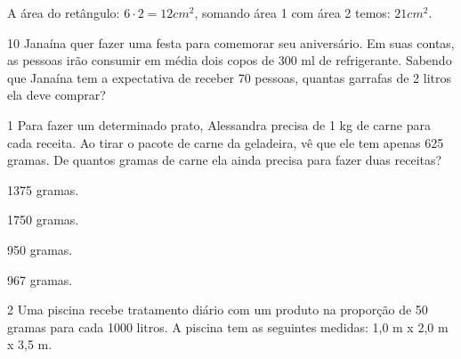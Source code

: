 {{{\begin{escolha}
{{{{\begin{escolha}
\begin{escolha}
{{\begin{enumerate}
{{{A área do retângulo: $6 \cdot 2 = 12 cm^2$, somando área 1 com área 2 temos: $21
cm^2$.}

\num{10} Janaína quer fazer uma festa para comemorar seu aniversário. Em suas
contas, as pessoas irão consumir em média dois copos de 300 ml de refrigerante.
Sabendo que Janaína tem a expectativa de receber 70 pessoas, quantas garrafas de
2 litros ela deve comprar?




\num{1} Para fazer um determinado prato, Alessandra precisa de 1 kg de carne
para cada receita. Ao tirar o pacote de carne da geladeira, vê que ele
tem apenas 625 gramas. De quantos gramas de carne ela ainda precisa para
fazer duas receitas?

\begin{escolha}

  \item 1375 gramas.

  \item 1750 gramas.

  \item 950 gramas.

  \item 967 gramas.

\end{escolha}


\num{2} Uma piscina recebe tratamento diário com um produto na proporção de
50 gramas para cada 1000 litros. A piscina tem as seguintes medidas:
1,0 m x 2,0 m x 3,5 m. 



}}
\end{enumerate}}}
\end{escolha}
\end{escolha}}}}}
\end{escolha}}}}

